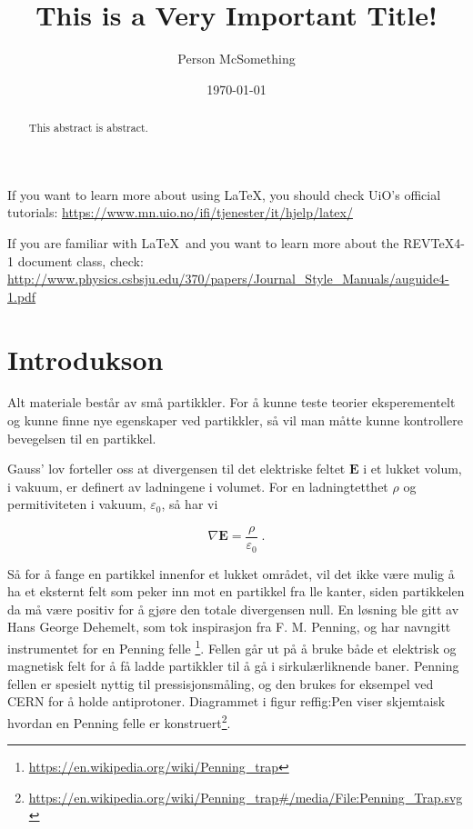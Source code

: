 \documentclass[reprint,english,notitlepage, nofootinbib]{revtex4-1}  %
\begin{document}
\title{This is a Very Important Title!}   %
\author{Person McSomething}               %
\date{\today}                             %
\noaffiliation                            %
\begin{abstract}                          %
This abstract is abstract.                %
\end{abstract}                            %
\maketitle                                %

If you want to learn more about using \LaTeX, you should check UiO's official tutorials:
\url{https://www.mn.uio.no/ifi/tjenester/it/hjelp/latex/}

If you are familiar with \LaTeX\ and you want to learn more about the REVTeX4-1 document class, check:
\url{http://www.physics.csbsju.edu/370/papers/Journal_Style_Manuals/auguide4-1.pdf}


\section{Introdukson}

Alt materiale består av små partikkler. For å kunne teste teorier eksperementelt og kunne finne nye egenskaper ved partikkler, så vil man måtte kunne kontrollere bevegelsen til en partikkel. 

Gauss' lov forteller oss at divergensen til det elektriske feltet $\mathbf{E}$ i et lukket volum, i vakuum, er definert av ladningene i volumet. For en ladningtetthet $\rho$ og permitiviteten i vakuum, $\varepsilon_0$, så har vi

\begin{equation}
\label{gauss}
\nabla{\mathbf{E}} = \frac{\rho}{\varepsilon_0} \; .
\end{equation} 

Så for å fange en partikkel innenfor et lukket området, vil det ikke være mulig å ha et eksternt felt som peker inn mot en partikkel fra lle kanter, siden partikkelen da må være positiv for å gjøre den totale divergensen null. En løsning ble gitt av Hans George Dehemelt, som tok inspirasjon fra F. M. Penning, og har navngitt instrumentet for en Penning felle \footnote{\url{https://en.wikipedia.org/wiki/Penning_trap}}. Fellen går ut på å bruke både et elektrisk og magnetisk felt for å få ladde partikkler til å gå i sirkulærliknende baner. Penning fellen er spesielt nyttig til pressisjonsmåling, og den brukes for eksempel ved CERN for å holde antiprotoner. Diagrammet i figur ref{fig:Pen} viser skjemtaisk hvordan en Penning felle er konstruert\footnote{\url{https://en.wikipedia.org/wiki/Penning_trap\#/media/File:Penning_Trap.svg}}. 
\end{document}
